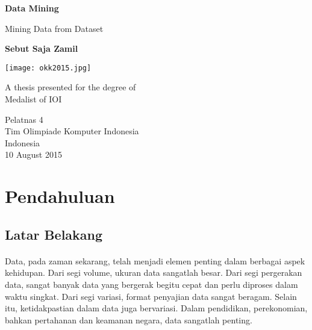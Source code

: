 \documentclass{article}
\begin{document}
\begin{titlepage}

\begin{center}
\vspace*{1cm}

\textbf{Data Mining}

\vspace{0.5cm}
Mining Data from Dataset

\vspace{1.5cm}

\textbf{Sebut Saja Zamil}

\vspace{1.5cm}

\texttt{[image: okk2015.jpg]}

\vspace{1.5cm}

A thesis presented for the degree of\\
Medalist of IOI

\vspace{0.8cm}

Pelatnas 4\\
Tim Olimpiade Komputer Indonesia\\
Indonesia\\
10 August 2015

\end{center}
\end{titlepage}

\section{Pendahuluan}

\subsection{Latar Belakang}

\paragraph{}
Data, pada zaman sekarang, telah menjadi elemen penting dalam berbagai aspek kehidupan. Dari segi volume, ukuran data sangatlah besar. Dari segi pergerakan data, sangat banyak data yang bergerak begitu cepat dan perlu diproses dalam waktu singkat. Dari segi variasi, format penyajian data sangat beragam. Selain itu, ketidakpastian dalam data juga bervariasi. Dalam pendidikan, perekonomian, bahkan pertahanan dan keamanan negara, data sangatlah penting.
\end{document}
